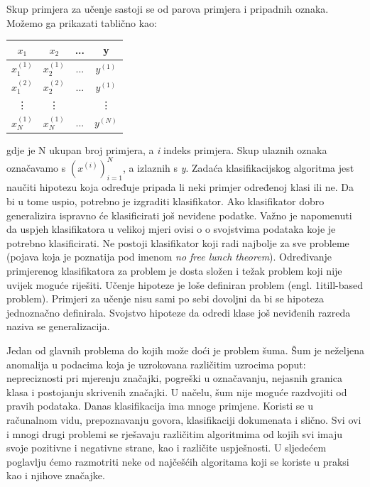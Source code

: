 \documentclass[times, utf8, zavrsni]{fer}
\begin{document}
Skup primjera za učenje sastoji se od parova primjera i pripadnih oznaka. Možemo ga prikazati tablično kao:

\begin{center}
 \begin{tabular}{||c c c c||} 
 \hline
 $x_1$ & $x_2$ & ... & y  \\ [0.5ex] 
 \hline\hline
 $x_1^{(1)}$ & $x_2^{(1)}$ & ... & $y^{(1)}$ \\ 
 \hline
 $x_1^{(2)}$ & $x_2^{(2)}$ & ... & $y^{(1)}$ \\
 \hline
 \vdots & \vdots &  & \vdots \\
 \hline
 $x_N^{(1)}$ & $x_N^{(1)}$ & ... & $y^{(N)}$ \\ [1ex] 
 \hline
\end{tabular}
\end{center} 


gdje je N ukupan broj primjera, a \textit{i} indeks primjera. Skup ulaznih oznaka označavamo s $(x^{(i)})_{i=1}^N$, a izlaznih s \textit{y}. Zadaća klasifikacijskog algoritma jest naučiti hipotezu koja određuje pripada li neki primjer određenoj klasi ili ne. Da bi u tome uspio, potrebno je izgraditi klasifikator. Ako klasifikator dobro generalizira ispravno će klasificirati još neviđene podatke. Važno je napomenuti da uspjeh klasifikatora u velikoj mjeri ovisi o o svojstvima podataka koje je potrebno klasificirati. Ne postoji klasifikator koji radi najbolje za sve probleme (pojava koja je poznatija pod imenom \textit{no free lunch theorem}). Određivanje primjerenog klasifikatora za problem je dosta složen i težak problem koji nije uvijek moguće riješiti. Učenje hipoteze je loše definiran problem (engl. \text1it{ill-based problem}). Primjeri za učenje nisu sami po sebi dovoljni da bi se hipoteza jednoznačno definirala. Svojstvo hipoteze da odredi klase još neviđenih razreda naziva se generalizacija. 

Jedan od glavnih problema do kojih može doći je problem šuma. Šum je neželjena anomalija u podacima koja je uzrokovana različitim uzrocima poput: nepreciznosti pri mjerenju značajki, pogreški u označavanju, nejasnih granica klasa i postojanju skrivenih značajki. U načelu, šum nije moguće razdvojiti od pravih podataka. Danas klasifikacija ima mnoge primjene. Koristi se u računalnom vidu, prepoznavanju govora, klasifikaciji dokumenata i slično. Svi ovi i mnogi drugi problemi se rješavaju različitim algoritmima od kojih svi imaju svoje pozitivne i negativne strane, kao i različite uspješnosti. U sljedećem poglavlju ćemo razmotriti neke od najčešćih algoritama koji se koriste u praksi kao i njihove značajke. 
\end{document}
